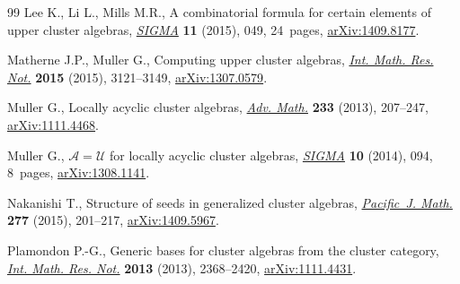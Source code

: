 \documentclass[pdftex]{sigma}
\numberwithin{equation}{section}
\begin{document}
\begin{thebibliography}{99}
Lee K., Li L., Mills M.R., A combinatorial formula for certain elements of
 upper cluster algebras, \href{https://doi.org/10.3842/SIGMA.2015.049}{\textit{SIGMA}} \textbf{11} (2015), 049, 24~pages,
 \href{https://arxiv.org/abs/1409.8177}{arXiv:1409.8177}.

Matherne J.P., Muller G., Computing upper cluster algebras, \href{https://doi.org/10.1093/imrn/rnu027}{\textit{Int. Math.
 Res. Not.}} \textbf{2015} (2015), 3121--3149, \href{https://arxiv.org/abs/1307.0579}{arXiv:1307.0579}.

Muller G., Locally acyclic cluster algebras, \href{https://doi.org/10.1016/j.aim.2012.10.002}{\textit{Adv. Math.}} \textbf{233}
 (2013), 207--247, \href{https://arxiv.org/abs/1111.4468}{arXiv:1111.4468}.

Muller G., {${\mathcal A}={\mathcal U}$} for locally acyclic cluster algebras,
 \href{https://doi.org/10.3842/SIGMA.2014.094}{\textit{SIGMA}} \textbf{10} (2014), 094, 8~pages, \href{https://arxiv.org/abs/1308.1141}{arXiv:1308.1141}.

Nakanishi T., Structure of seeds in generalized cluster algebras,
 \href{https://doi.org/10.2140/pjm.2015.277.201}{\textit{Pacific~J. Math.}} \textbf{277} (2015), 201--217, \href{https://arxiv.org/abs/1409.5967}{arXiv:1409.5967}.

Plamondon P.-G., Generic bases for cluster algebras from the cluster category,
 \href{https://doi.org/10.1093/imrn/rns102}{\textit{Int. Math. Res. Not.}} \textbf{2013} (2013), 2368--2420,
 \href{https://arxiv.org/abs/1111.4431}{arXiv:1111.4431}.

\end{thebibliography}\LastPageEnding
\end{document}

